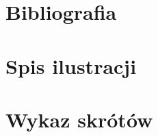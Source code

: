 \chapter*{Bibliografia}
\label{cha:bibliografia}

\chapter*{Spis ilustracji}
\chapter*{Wykaz skrótów}

\printbibliography[heading=none]

\listoffigures